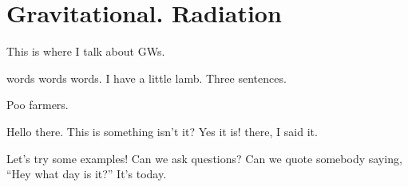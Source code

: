 

\chapter{Gravitational. Radiation}
This is where I talk about GWs.

words words words. I have a little lamb. Three sentences.

Poo farmers. %

Hello there. This is something isn't it? Yes it is! there, I said it. %

Let's try some examples! Can we ask questions? Can we quote somebody saying, ``Hey what day is it?'' It's today.



